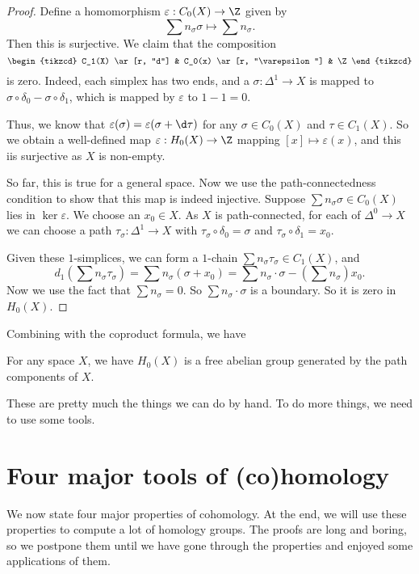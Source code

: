 \documentclass[a4paper]{article}
\begin{document}
\begin{proof}
  Define a homomorphism $\varepsilon: C_0(X) \to \Z$ given by
  \[
    \sum n_\sigma \sigma \mapsto \sum n_\sigma.
  \]
  Then this is surjective. We claim that the composition
  \[
    \begin{tikzcd}
      C_1(X) \ar[r, "d"] & C_0(x) \ar[r, "\varepsilon"] & \Z
    \end{tikzcd}
  \]
  is zero. Indeed, each simplex has two ends, and a $\sigma: \Delta^1 \to X$ is mapped to $\sigma \circ \delta_0 - \sigma \circ \delta_1$, which is mapped by $\varepsilon$ to $1 - 1 = 0$.

  Thus, we know that $\varepsilon(\sigma) = \varepsilon (\sigma + \d \tau)$ for any $\sigma \in C_0(X)$ and $\tau \in C_1(X)$. So we obtain a well-defined map $\varepsilon: H_0(X) \to \Z$ mapping $[x] \mapsto \varepsilon(x)$, and this iis surjective as $X$ is non-empty.

  So far, this is true for a general space. Now we use the path-connectedness condition to show that this map is indeed injective. Suppose $\sum n_\sigma \sigma \in C_0(X)$ lies in $\ker \varepsilon$. We choose an $x_0 \in X$. As $X$ is path-connected, for each of $\Delta^0 \to X$ we can choose a path $\tau_\sigma: \Delta^1 \to X$ with $\tau_\sigma \circ \delta_0 = \sigma$ and $\tau_\sigma \circ \delta_1 = x_0$.

  Given these $1$-simplices, we can form a $1$-chain $\sum n_\sigma \tau_\sigma \in C_1(X)$, and
  \[
    d_1\left(\sum n_\sigma \tau_\sigma\right)= \sum n_\sigma(\sigma + x_0) = \sum n_\sigma \cdot \sigma - \left(\sum n_\sigma\right) x_0.
  \]
  Now we use the fact that $\sum n_\sigma = 0$. So $\sum n_\sigma \cdot \sigma$ is a boundary. So it is zero in $H_0(X)$.
\end{proof}

Combining with the coproduct formula, we have
\begin{prop}
  For any space $X$, we have $H_0(X)$ is a free abelian group generated by the path components of $X$.
\end{prop}
These are pretty much the things we can do by hand. To do more things, we need to use some tools.

\section{Four major tools of (co)homology}
We now state four major properties of cohomology. At the end, we will use these properties to compute a lot of homology groups. The proofs are long and boring, so we postpone them until we have gone through the properties and enjoyed some applications of them.
\end{document}
